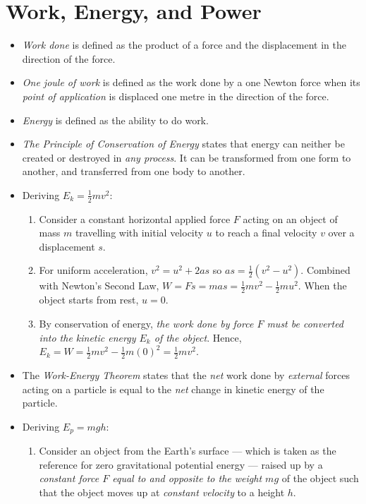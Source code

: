 \documentclass[oneside]{book}
\begin{document}
\chapter{Work, Energy, and Power}
\begin{itemize}
    \item \emph{Work done} is defined as the product of a force and the displacement in the direction of the force.
    \item \emph{One joule of work} is defined as the work done by a one Newton force when its \emph{point of application} is displaced one metre in the direction of the force.
    \item \emph{Energy} is defined as the ability to do work.
    \item \emph{The Principle of Conservation of Energy} states that energy can neither be created or destroyed in \emph{any process}. It can be transformed from one form to another, and transferred from one body to another.
    \item Deriving \(E_k=\frac{1}{2}mv^2\): 
    \begin{enumerate}
        \item Consider a constant horizontal applied force \(F\) acting on an object of mass \(m\) travelling with initial velocity \(u\) to reach a final velocity \(v\) over a displacement \(s\). 
        \item For uniform acceleration, \(v^2=u^2+2as\) so \(as=\frac{1}{2}(v^2-u^2)\). Combined with Newton's Second Law, \(W=Fs=mas=\frac{1}{2}mv^2-\frac{1}{2}mu^2\). When the object starts from rest, \(u=0\). 
        \item By conservation of energy,\emph{ the work done by force \(F\) must be converted into the kinetic energy \(E_k\) of the object}. Hence, \(E_k=W=\frac{1}{2}mv^2-\frac{1}{2}m(0)^2=\frac{1}{2}mv^2\).
    \end{enumerate}
    \item The \emph{Work-Energy Theorem} states that the \emph{net} work done by \emph{external} forces acting on a particle is equal to the \emph{net} change in kinetic energy of the particle.
    \item Deriving \(E_p=mgh\):
    \begin{enumerate}
        \item Consider an object from the Earth's surface --- which is taken as the reference for zero gravitational potential energy --- raised up by a \emph{constant force \(F\) equal to and opposite to the weight \(mg\)} of the object such that the object moves up at \emph{constant velocity} to a height \(h\). 

\end{enumerate}
\end{itemize}
\end{document}
